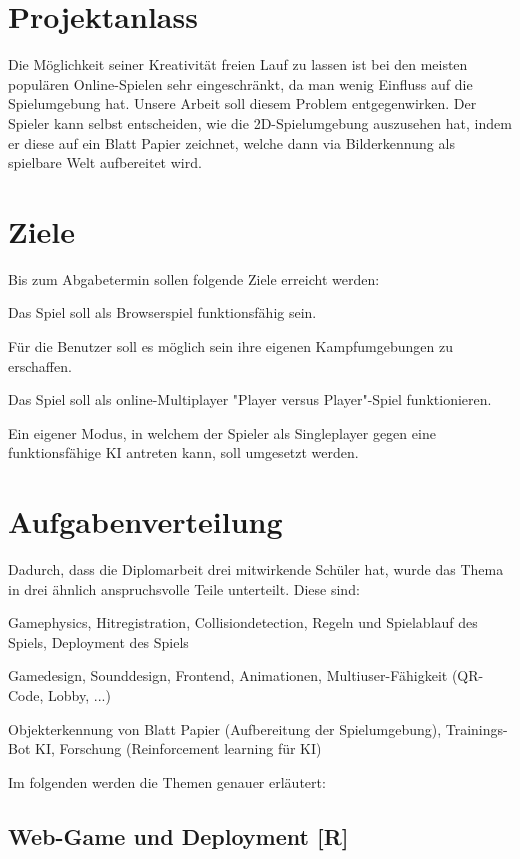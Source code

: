 \section{Projektanlass}
Die Möglichkeit seiner Kreativität freien Lauf zu lassen ist bei den meisten populären
Online-Spielen sehr eingeschränkt, da man wenig Einfluss auf die Spielumgebung hat.
Unsere Arbeit soll diesem Problem entgegenwirken. Der Spieler kann selbst entscheiden,
wie die 2D-Spielumgebung auszusehen hat, indem er diese auf ein Blatt Papier zeichnet,
welche dann via Bilderkennung als spielbare Welt aufbereitet wird.

\section{Ziele}
Bis zum Abgabetermin sollen folgende Ziele erreicht werden:
\begin{compactitem}
    \item Das Spiel soll als Browserspiel funktionsfähig sein.
    \item Für die Benutzer soll es möglich sein ihre eigenen Kampfumgebungen zu erschaffen.
    \item Das Spiel soll als online-Multiplayer "Player versus Player"-Spiel funktionieren.
    \item Ein eigener Modus, in welchem der Spieler als Singleplayer gegen eine funktionsfähige KI antreten kann, soll umgesetzt werden.
\end{compactitem}

\section{Aufgabenverteilung}
Dadurch, dass die Diplomarbeit drei mitwirkende Schüler hat, wurde das Thema in drei ähnlich
anspruchsvolle Teile unterteilt. Diese sind:
\begin{compactenum}
    \item Gamephysics, Hitregistration, Collisiondetection, Regeln und Spielablauf des Spiels, Deployment des Spiels
    \item Gamedesign, Sounddesign, Frontend, Animationen, Multiuser-Fähigkeit (QR-Code, Lobby, ...)
    \item Objekterkennung von Blatt Papier (Aufbereitung der Spielumgebung), Trainings-Bot KI, Forschung (Reinforcement learning für KI)
\end{compactenum}
Im folgenden werden die Themen genauer erläutert:

\subsection{Web-Game und Deployment [R]}

